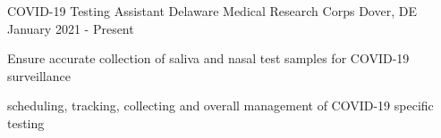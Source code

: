 

\begin{cventries}

  \cventry
    {COVID-19 Testing Assistant} %
    {Delaware Medical Research Corps} %
    {Dover, DE} %
    {January 2021 - Present} %
    {
      \begin{cvitems} %
        \item {Ensure accurate collection of saliva and nasal test samples for COVID-19 surveillance}
        \item {scheduling, tracking, collecting and overall management of COVID-19 specific testing}
      \end{cvitems}
    }
\end{cventries}